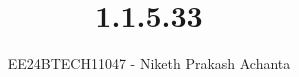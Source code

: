 \documentclass[journal]{IEEEtran}
\begin{document}

\vspace{3cm}

\title{1.1.5.33}
\author{EE24BTECH11047 - Niketh Prakash Achanta
}
{\let\newpage\relax\maketitle}

\renewcommand{\thefigure}{\theenumi}
\renewcommand{\thetable}{\theenumi}
\setlength{\intextsep}{10pt} %


\renewcommand{\thetable}{\theenumi}
\end{document}
